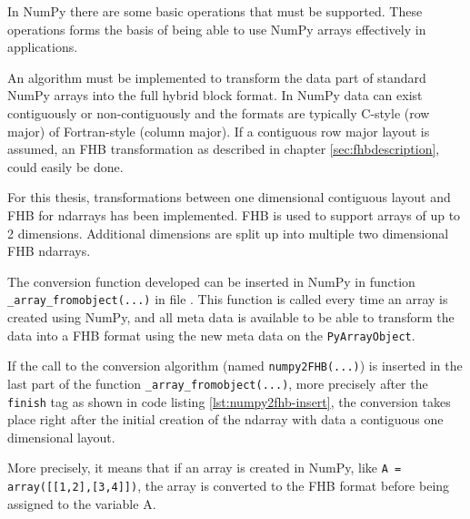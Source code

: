 In NumPy there are some basic operations that must be supported. These operations
forms the basis of being able to use NumPy arrays effectively in applications.

An algorithm must be implemented to transform the data part of standard NumPy arrays into the full hybrid block format.
In NumPy data can exist contiguously or non-contiguously and the formats are typically C-style (row major) of
Fortran-style (column major).
If a contiguous row major layout is assumed, an FHB transformation as described in chapter \ref{sec:fhbdescription}, could easily be done.

For this thesis, transformations between one dimensional contiguous layout and FHB for ndarrays has been implemented.
FHB is used to support arrays of up to 2 dimensions. Additional dimensions are split up into multiple two dimensional FHB ndarrays.

The conversion function developed can be inserted in NumPy in function \texttt{\_array\_fromobject(...)} in file .
This function is called every time an array is created using NumPy, and all meta data is available to be able to transform the data
into a FHB format using the new meta data on the \texttt{PyArrayObject}.

If the call to the conversion algorithm (named \texttt{numpy2FHB(...)}) is inserted in the last part of the function \texttt{\_array\_fromobject(...)},
more precisely after the \texttt{finish} tag as shown in code listing \ref{lst:numpy2fhb-insert}, the conversion takes place
right after the initial creation of the ndarray with data a contiguous one dimensional layout.

More precisely, it means that if an array is created in NumPy, like \texttt{A = array([[1,2],[3,4]])}, the array is converted
to the FHB format before being assigned to the variable A.






